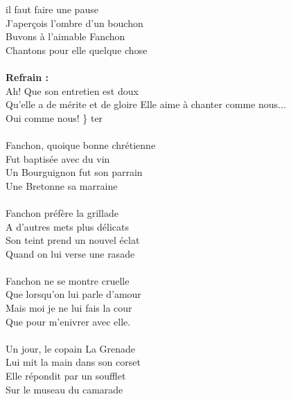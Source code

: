 
 il faut faire une pause
\\J'aperçois l'ombre d'un bouchon
\\Buvons à l'aimable Fanchon
\\Chantons pour elle quelque chose
\\\\\textbf{Refrain :}
\\Ah! Que son entretien est doux
\\Qu'elle a de mérite et de gloire
{Elle aime à chanter comme nous...}
\\Oui comme nous! \} ter
\\\\Fanchon, quoique bonne chrétienne
\\Fut baptisée avec du vin
\\Un Bourguignon fut son parrain
\\Une Bretonne sa marraine
\\\\Fanchon préfère la grillade
\\A d'autres mets plus délicats
\\Son teint prend un nouvel éclat
\\Quand on lui verse une rasade
\\\\Fanchon ne se montre cruelle
\\Que lorsqu'on lui parle d'amour
\\Mais moi je ne lui fais la cour
\\Que pour m'enivrer avec elle.
\\\\Un jour, le copain La Grenade
\\Lui mit la main dans son corset
\\Elle répondit par un soufflet
\\Sur le museau du camarade
\breakpage

